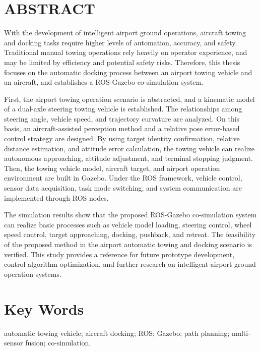 
\section*{ABSTRACT}

With the development of intelligent airport ground operations, aircraft towing and docking tasks require higher levels of automation, accuracy, and safety. Traditional manual towing operations rely heavily on operator experience, and may be limited by efficiency and potential safety risks. Therefore, this thesis focuses on the automatic docking process between an airport towing vehicle and an aircraft, and establishes a ROS-Gazebo co-simulation system.

First, the airport towing operation scenario is abstracted, and a kinematic model of a dual-axle steering towing vehicle is established. The relationships among steering angle, vehicle speed, and trajectory curvature are analyzed. On this basis, an aircraft-assisted perception method and a relative pose error-based control strategy are designed. By using target identity confirmation, relative distance estimation, and attitude error calculation, the towing vehicle can realize autonomous approaching, attitude adjustment, and terminal stopping judgment. Then, the towing vehicle model, aircraft target, and airport operation environment are built in Gazebo. Under the ROS framework, vehicle control, sensor data acquisition, task mode switching, and system communication are implemented through ROS nodes.

The simulation results show that the proposed ROS-Gazebo co-simulation system can realize basic processes such as vehicle model loading, steering control, wheel speed control, target approaching, docking, pushback, and retreat. The feasibility of the proposed method in the airport automatic towing and docking scenario is verified. This study provides a reference for future prototype development, control algorithm optimization, and further research on intelligent airport ground operation systems.

\section*{Key Words}
automatic towing vehicle; aircraft docking; ROS; Gazebo; path planning; multi-sensor fusion; co-simulation.
